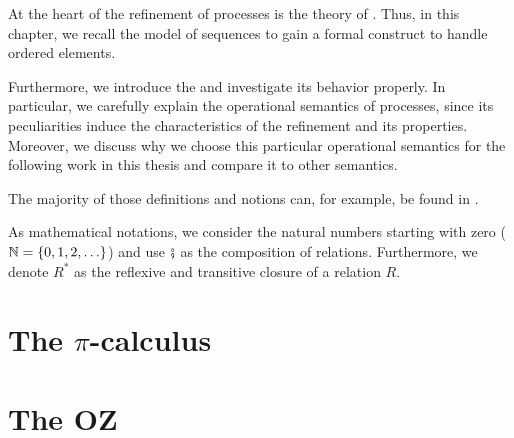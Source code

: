 At the heart of the refinement of \findex{\picalc{}} processes is the theory of . Thus, in this chapter, we recall the model of sequences to gain a formal construct to handle ordered elements.%

Furthermore, we introduce the \picalc{} and investigate its behavior properly. In particular, we carefully explain the operational semantics of \picalc{} processes, since its peculiarities induce the characteristics of the refinement and its properties. Moreover, we discuss why we choose this particular operational semantics for the following work in this thesis and compare it to other semantics.

The majority of those definitions and notions can, for example, be found in \cite{milner,sangiorgi,meyer,caires}.

As mathematical notations, we consider the natural numbers starting with zero ($\N=\set{0,1,2,\ldots}$) and use $\fatsemi$ as the composition of relations. Furthermore, we denote $R^*$ as the reflexive and transitive closure of a relation $R$.


\section{The \texorpdfstring{$\pi$}{pi}-calculus}
\label{sec_pi_calculus}


\section{The OZ}
\label{sec_oz}



